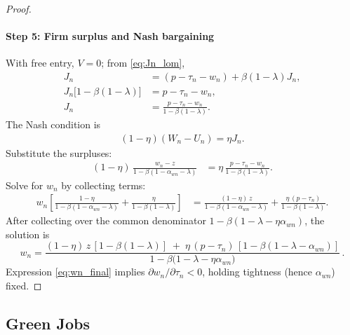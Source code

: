 \documentclass[preprint,12pt]{elsarticle}
\begin{document}
\begin{proof}
\paragraph{Step 5: Firm surplus and Nash bargaining}
With free entry, \(V=0\); from \eqref{eq:Jn_lom},
\begin{align}
J_n &= (p-\tau_n-w_n) + \beta(1-\lambda)J_n,\\
J_n\big[1-\beta(1-\lambda)\big] &= p-\tau_n-w_n,\\
J_n &= \frac{p-\tau_n-w_n}{1-\beta(1-\lambda)}.
\end{align}
The Nash condition is
\begin{align}
(1-\eta)(W_n-U_n) = \eta J_n.
\end{align}
Substitute the surpluses:
\begin{align}
(1-\eta)\,\frac{w_n - z}{1-\beta(1-\alpha_{wn}-\lambda)}
&= \eta\,\frac{p-\tau_n-w_n}{1-\beta(1-\lambda)}.
\end{align}
Solve for \(w_n\) by collecting terms:
\begin{align}
w_n\left[
\frac{1-\eta}{1-\beta(1-\alpha_{wn}-\lambda)}
+ \frac{\eta}{1-\beta(1-\lambda)}
\right]
&=
\frac{(1-\eta)\,z}{1-\beta(1-\alpha_{wn}-\lambda)}
+
\frac{\eta\,(p-\tau_n)}{1-\beta(1-\lambda)}.
\end{align}
After collecting over the common denominator \(1-\beta(1-\lambda-\eta\alpha_{wn})\), the solution is
\begin{equation}
\boxed{
w_n
=
\frac{(1-\eta)\,z\,[1-\beta(1-\lambda)]
\;+\;
\eta\,(p-\tau_n)\,[1-\beta(1-\lambda-\alpha_{wn})]}
{1-\beta\big(1-\lambda-\eta\alpha_{wn}\big)}\,.
}
\label{eq:wn_final}
\end{equation}
Expression \eqref{eq:wn_final} implies \(\partial w_n/\partial\tau_n<0\), holding tightness (hence \(\alpha_{wn}\)) fixed.
\end{proof}

\subsection{Green Jobs}
\label{app green wage}
\end{document}
